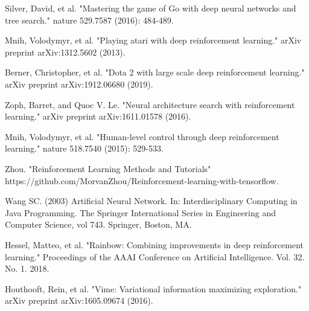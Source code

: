 \documentclass[12pt]{article}
\begin{document}
\begin{thebibliography}{99}
	Silver, David, et al. "Mastering the game of Go with deep neural networks and tree search." nature 529.7587 (2016): 484-489.

	Mnih, Volodymyr, et al. "Playing atari with deep reinforcement learning." arXiv preprint arXiv:1312.5602 (2013).

	Berner, Christopher, et al. "Dota 2 with large scale deep reinforcement learning." arXiv preprint arXiv:1912.06680 (2019).

    Zoph, Barret, and Quoc V. Le. "Neural architecture search with reinforcement learning." arXiv preprint arXiv:1611.01578 (2016).

    Mnih, Volodymyr, et al. "Human-level control through deep reinforcement learning." nature 518.7540 (2015): 529-533.

    Zhou. "Reinforcement Learning Methods and Tutorials" https://github.com/MorvanZhou/Reinforcement-learning-with-tensorflow.

    Wang SC. (2003) Artificial Neural Network. In: Interdisciplinary Computing in Java Programming. The Springer International Series in Engineering and Computer Science, vol 743. Springer, Boston, MA.

    Hessel, Matteo, et al. "Rainbow: Combining improvements in deep reinforcement learning." Proceedings of the AAAI Conference on Artificial Intelligence. Vol. 32. No. 1. 2018.

    Houthooft, Rein, et al. "Vime: Variational information maximizing exploration." arXiv preprint arXiv:1605.09674 (2016).
\end{thebibliography}
\end{document}
